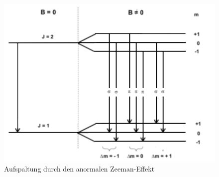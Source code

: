 \begin{figure}[h!]
  \centering
  \includegraphics[width=\textwidth]{anormal.png}
  \caption{Aufspaltung durch den anormalen Zeeman-Effekt \cite{1}}
  \label{fig:normal}
\end{figure}
